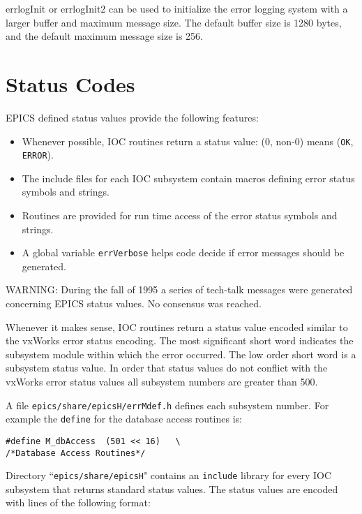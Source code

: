 errlogInit or errlogInit2 can be used to initialize the error logging system with a larger buffer and maximum message size. 
The default buffer size is 1280 bytes, and the default maximum message size is 256.

\section{Status Codes}

EPICS defined status values provide the following features:

\begin{itemize}
\item Whenever possible, IOC routines return a status value: (0, non-0) means (\verb|OK|, \verb|ERROR|).

\item The include files for each IOC subsystem contain macros defining error status symbols and strings.

\item Routines are provided for run time access of the error status symbols and strings.

\item A global variable \verb|errVerbose| helps code decide if error messages should be generated.

\end{itemize}

WARNING: During the fall of 1995 a series of tech-talk messages were generated concerning EPICS status values. No 
consensus was reached.

Whenever it makes sense, IOC routines return a status value encoded similar to the vxWorks error status encoding. The 
most significant short word indicates the subsystem module within which the error occurred. The low order short word is 
a subsystem status value. In order that status values do not conflict with the vxWorks error status values all subsystem 
numbers are greater than 500. 

A file \verb|epics/share/epicsH/errMdef.h| defines each subsystem number. For example the \verb|define| for the 
database access routines is:

\begin{verbatim}
#define M_dbAccess  (501 << 16)   \
/*Database Access Routines*/
\end{verbatim}

Directory ``\verb|epics/share/epicsH|" contains an \verb|include| library for every IOC subsystem that returns standard status 
values. The status values are encoded with lines of the following format: 

